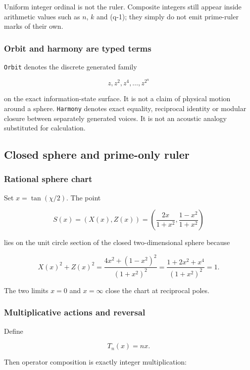 Uniform integer ordinal is not the ruler. Composite integers still
appear inside arithmetic values such as \(n\), \(k\) and (q-1); they
simply do not emit prime-ruler marks of their own.

\subsubsection{Orbit and harmony are typed
terms}\label{viii-ch10-orbit-and-harmony-are-typed-terms}

\texttt{Orbit} denotes the discrete generated family

\[
z,z^2,z^4,\ldots,z^{2^n}
\]

on the exact information-state surface. It is not a claim of physical
motion around a sphere. \texttt{Harmony} denotes exact equality,
reciprocal identity or modular closure between separately generated
voices. It is not an acoustic analogy substituted for calculation.

\subsection{Closed sphere and prime-only
ruler}\label{viii-ch10-closed-sphere-and-prime-only-ruler}

\subsubsection{Rational sphere chart}\label{viii-ch10-rational-sphere-chart}

Set \(x=\tan(\chi/2)\). The point

\[
S(x)=\left(X(x),Z(x)\right)
=\left(\frac{2x}{1+x^2},\frac{1-x^2}{1+x^2}\right)
\]

lies on the unit circle section of the closed two-dimensional sphere
because

\[
X(x)^2+Z(x)^2
=\frac{4x^2+(1-x^2)^2}{(1+x^2)^2}
=\frac{1+2x^2+x^4}{(1+x^2)^2}
=1.
\]

The two limits \(x=0\) and \(x=\infty\) close the chart at reciprocal
poles.

\subsubsection{Multiplicative actions and
reversal}\label{viii-ch10-multiplicative-actions-and-reversal}

Define

\[
T_n(x)=nx.
\]

Then operator composition is exactly integer multiplication:


